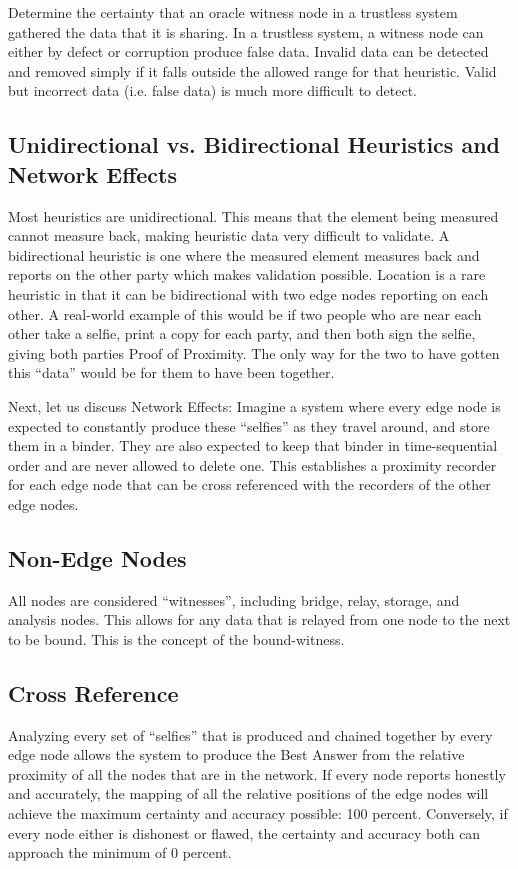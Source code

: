 \documentclass{article}
\begin{document}
Determine the \gls{certainty} that an \gls{oracle} witness node in a trustless system gathered the data that it is sharing. In a trustless system, a witness node can either by defect or corruption produce false data. Invalid data can be detected and removed simply if it falls outside the allowed range for that \gls{heuristic}. Valid but incorrect data (i.e. false data) is much more difficult to detect. 

\subsection {Unidirectional vs. Bidirectional Heuristics and Network Effects}
Most \glspl{heuristic} are unidirectional. This means that the element being measured cannot measure back, making heuristic data very difficult to validate. A bidirectional heuristic is one where the measured element measures back and reports on the other party which makes validation possible. Location is a rare heuristic in that it can be bidirectional with two edge nodes reporting on each other. A real-world example of this would be if two people who are near each other take a selfie, print a copy for each party, and then both sign the selfie, giving both parties Proof of Proximity. The only way for the two to have gotten this ``data'' would be for them to have been together.

Next, let us discuss Network Effects: Imagine a system where every edge node is expected to constantly produce these ``selfies'' as they travel around, and store them in a binder. They are also expected to keep that binder in time-sequential order and are never allowed to delete one. This establishes a proximity recorder for each edge node that can be cross referenced with the recorders of the other edge nodes.

\subsection {Non-Edge Nodes}
All nodes are considered ``witnesses'', including bridge, relay, storage, and analysis nodes. This allows for any data that is relayed from one node to the next to be bound. This is the concept of the \Gls{bound-witness}.

\subsection {Cross Reference}
Analyzing every set of ``selfies'' that is produced and chained together by every edge node allows the system to produce the Best Answer from the relative proximity of all the nodes that are in the network. If every node reports honestly and accurately, the mapping of all the relative positions of the edge nodes will achieve the maximum \gls{certainty} and \gls{accuracy} possible: 100 percent. Conversely, if every node either is dishonest or flawed, the certainty and accuracy both can approach the minimum of 0 percent.
\end{document}
